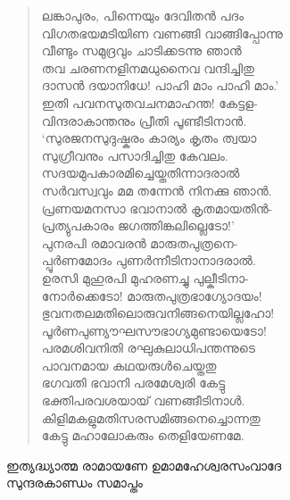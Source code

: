\begin{verse}
ലങ്കാപുരം, പിന്നെയും ദേവിതന്‍ പദം\\
വിഗതഭയമടിയിണ വണങ്ങി വാങ്ങിപ്പോന്നു\\
വീണ്ടും സമുദ്രവും ചാടിക്കടന്നു ഞാന്‍\\
തവ ചരണനളിനമധുനൈവ വന്ദിച്ചിതു\\
ദാസന്‍ ദയാനിധേ! പാഹി മാം പാഹി മാം.’\\
ഇതി പവനസുതവചനമാഹന്ത! കേട്ടള-\\
വിന്ദരാകാന്തനും പ്രീതി പൂണ്ടീടിനാന്‍.\\
‘സുരജനസുദുഷ്കരം കാര്യം കൃതം ത്വയാ\\
സുഗ്രീവനും പസാദിച്ചിതു കേവലം.\\
സദയമുപകാരമിച്ചെയ്തതിന്നാദരാല്‍\\
സര്‍വസ്വവും മമ തന്നേന്‍ നിനക്കു ഞാന്‍.\\
പ്രണയമനസാ ഭവാനാല്‍ കൃതമായതിന്‍-\\
പ്രത്യുപകാരം ജഗത്തിങ്കലില്ലെടോ!’\\
പുനരപി രമാവരന്‍ മാരുതപുത്രനെ-\\
പ്പൂര്‍ണമോദം പുണര്‍ന്നീടിനാനാദരാല്‍.\\
ഉരസി മുഹുരപി മുഹരണച്ചു പുല്കീടിനാ-\\
നോര്‍ക്കെടോ! മാരുതപുത്രഭാഗ്യോദയം!\\
ഭുവനതലമതിലൊരുവനിങ്ങനെയില്ലഹോ!\\
പൂര്‍ണപുണ്യൗഘസൗഭാഗ്യമുണ്ടായെടോ!\\
പരമശിവനിതി രഘുകുലാധിപന്തന്നുടെ\\
പാവനമായ കഥയരുള്‍ചെയ്തതു\\
ഭഗവതി ഭവാനി പരമേശ്വരി കേട്ടു\\
ഭക്തിപരവശയായ് വണങ്ങീടിനാള്‍.\\
കിളിമകളുമതിസരസമിങ്ങനെച്ചൊന്നതു\\
കേട്ടു മഹാലോകരും തെളിയേണമേ.
\end{verse}

\begin{center}
ഇത്യദ്ധ്യാത്മ രാമായണേ ഉമാമഹേശ്വരസംവാദേ\\
സുന്ദരകാണ്ഡം സമാപ്തം
\end{center}



